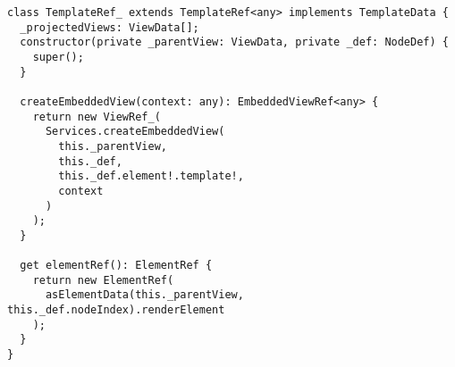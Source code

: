 \begin{verbatim}
class TemplateRef_ extends TemplateRef<any> implements TemplateData {
  _projectedViews: ViewData[];
  constructor(private _parentView: ViewData, private _def: NodeDef) {
    super();
  }

  createEmbeddedView(context: any): EmbeddedViewRef<any> {
    return new ViewRef_(
      Services.createEmbeddedView(
        this._parentView,
        this._def,
        this._def.element!.template!,
        context
      )
    );
  }

  get elementRef(): ElementRef {
    return new ElementRef(
      asElementData(this._parentView, this._def.nodeIndex).renderElement
    );
  }
}
\end{verbatim}
